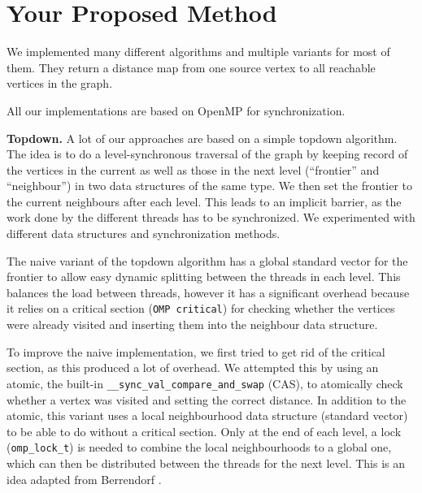 \documentclass[letterpaper]{article}
\newcommand{\mypar}[1]{{\bf #1.}} %
\begin{document}
	\section{Your Proposed Method}\label{sec:yourmethod}
	
	
	We implemented many different algorithms and multiple variants for most of them. They return a distance map from one source vertex to all reachable vertices in the graph.
	
	All our implementations are based on OpenMP for synchronization.
	
	
	\mypar{Topdown}
	A lot of our approaches are based on a simple topdown algorithm. 
	The idea is to do a level-synchronous traversal of the graph by keeping record of the vertices in the current as well as those in the next level (``frontier'' and ``neighbour'') in two data structures of the same type. 
	We then set the frontier to the current neighbours after each level. 
	This leads to an implicit barrier, as the work done by the different threads has to be synchronized. 
	We experimented with different data structures and synchronization methods.
	
	The naive variant of the topdown algorithm has a global standard vector for the frontier to allow easy dynamic splitting between the threads in each level. 
	This balances the load between threads, however it has a significant overhead because it relies on a critical section (\verb+OMP critical+) for checking whether the vertices were already visited and inserting them into the neighbour data structure.
	
	To improve the naive implementation, we first tried to get rid of the critical section, as this produced a lot of overhead. 
	We attempted this by using an atomic, the built-in \verb+__sync_val_compare_and_swap+ (CAS), to atomically check whether a vertex was visited and setting the correct distance. 
	In addition to the atomic, this variant uses a local neighbourhood data structure (standard vector) to be able to do without a critical section. 
	Only at the end of each level, a lock (\verb+omp_lock_t+) is needed to combine the local neighbourhoods to a global one, which can then be distributed between the threads for the next level. 
	This is an idea adapted from Berrendorf \cite{Berrendorf:14}.
	
\end{document}
